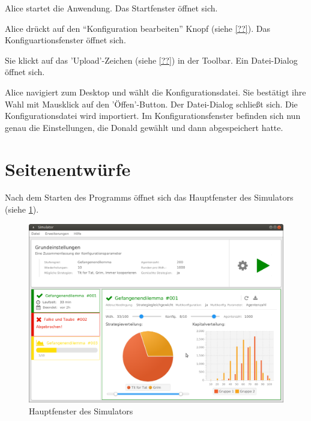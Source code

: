 \documentclass[parskip=full,11pt]{scrartcl}
\begin{document}
{Alice startet die Anwendung.}
{Das Startfenster öffnet sich.}

{Alice drückt auf den \enquote{Konfiguration bearbeiten} Knopf (siehe \cref{??}).}
{Das Konfiguartionsfenster öffnet sich.}

{Sie klickt auf das 'Upload'-Zeichen (siehe \cref{??}) in der Toolbar.}
{Ein Datei-Dialog öffnet sich.}

\teststep{}
{Alice navigiert zum Desktop und wählt die Konfigurationsdatei. Sie bestätigt ihre Wahl mit Mausklick auf den 'Öffen'-Button.}
{Der Datei-Dialog schließt sich. Die Konfigurationsdatei wird importiert. Im Konfigurationsfenster befinden sich nun genau die Einstellungen, die Donald gewählt und dann abgespeichert hatte.}

\appendix
\newpage
\section{Seitenentwürfe}

Nach dem Starten des Programms öffnet sich das Hauptfenster des Simulators \\(siehe \cref{fig:home}).

\begin{figure}[hb]
	\includegraphics[width=\textwidth]{images/home.png}
	\caption{\label{fig:home}
		Hauptfenster des Simulators}
\end{figure}
\end{document}
